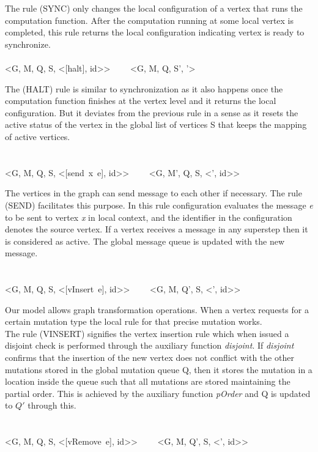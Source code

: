 \smallskip

The rule (SYNC) only changes the local configuration of a vertex that runs the computation function. After the computation running at some local vertex is completed, this rule returns the local configuration indicating vertex is ready to synchronize. 
\ \\
\ \\
{<G, M, Q, S, \Sigma <[halt], id>> \ \ \reducesto \ \ <G, M, Q, S', \Sigma '>}

\smallskip

The (HALT) rule is similar to synchronization as it also happens once the computation function finishes at the vertex level and it returns the local configuration. But it deviates from the previous rule in a sense as it resets the active status of the vertex in the global list of vertices S that keeps the mapping of active vertices.\\
\ \\
\ \\
{<G, M, Q, S, \Sigma <[send\ x\ e], id>> \ \ \reducesto \ \ <G, M', Q, S, \Sigma<', id>>}

\smallskip

The vertices in the graph can send message to each other if necessary. The rule (SEND) facilitates this purpose. In this rule configuration evaluates the message \emph{e} to be sent to vertex \emph{x} in local context, and the identifier in the configuration denotes the source vertex. If a vertex receives a message in any superstep then it is considered as active. The global message queue is updated with the new message.\\
\ \\
\ \\
{<G, M, Q, S, \Sigma <[vInsert\ e], id>> \ \ \reducesto \ \ <G, M, Q', S, \Sigma <', id>>}

\smallskip

Our model allows graph transformation operations. When a vertex requests for a certain mutation type the local rule for that precise mutation works.\\
The rule (VINSERT) signifies the vertex insertion rule which when issued a disjoint check is performed through the auxiliary function \emph{disjoint}. If \emph{disjoint} confirms that the insertion of the new vertex does not conflict with the other mutations stored in the global mutation queue  Q, then it stores the mutation in a location inside the queue such that all mutations are stored maintaining the partial order. This is achieved by the auxiliary function \emph{pOrder} and Q is updated to $Q'$ through this.\\
\ \\
\ \\
{<G, M, Q, S, \Sigma <[vRemove\ e], id>> \ \ \reducesto \ \ <G, M, Q', S, \Sigma <', id>>}

